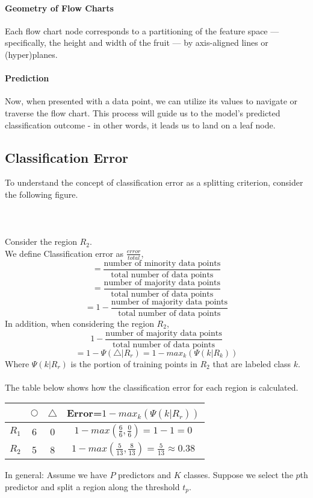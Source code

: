 \documentclass[11pt,a4paper]{report}
\begin{document}
\paragraph{Geometry of Flow Charts}Each flow chart node corresponds to a partitioning of the feature space — specifically, the height and width of the fruit — by axis-aligned lines or (hyper)planes.
\paragraph{Prediction}Now, when presented with a data point, we can utilize its values to navigate or traverse the flow chart. This process will guide us to the model's predicted classification outcome - in other words, it leads us to land on a leaf node.

\subsection{Classification Error}
To understand the concept of classification error as a splitting criterion, consider the following figure.\\\\
\\\\
Consider the region $R_2$.\\
We define Classification error as $\frac{error}{total}$,
$$=\frac{\textrm{number of minority data points}}{\textrm{total number of data points}}$$
$$=\frac{\textrm{number of majority data points}}{\textrm{total number of data points}}$$
$$=1-\frac{\textrm{number of majority data points}}{\textrm{total number of data points}}$$
In addition, when considering the region $R_2$,
$$1-\frac{\textrm{number of majority data points}}{\textrm{total number of data points}}$$
$$=1-\Psi(\triangle|R_r) = 1 - max_k(\Psi(k|R_k))$$
Where $\Psi(k|R_r)$ is the portion of training points in $R_2$ that are labeled class $k$.\\\\The table below shows how the classification error for each region is calculated.

\begin{center}
\begin{tabular}{ |c|c|c|c| } 
 \hline
  & $\bigcirc$ & $\triangle$ & Error=$1-max_k(\Psi(k|R_r))$\\\hline\hline
 $R_1$ & 6 & 0 & $1 - max(\frac{6}{6}, \frac{0}{6})= 1-1=0$\\\hline
 $R_2$ & 5 & 8 & $1 - max(\frac{5}{13}, \frac{8}{13}) = \frac{5}{13} \approx 0.38$\\\hline
\end{tabular}
\end{center}
In general: Assume we have $P$ predictors and $K$ classes. Suppose we select the $p$th predictor and split a region along the threshold $t_p$.
\end{document}
